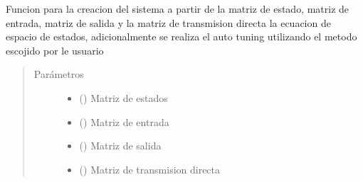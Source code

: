 \documentclass[letterpaper,10pt,spanish]{sphinxmanual}
\begin{document}
\begin{fulllineitems}
\label{\detokenize{codigos/rutinas_PID:rutinas_PID.system_creator_ss_tuning}}
Funcion para la creacion del sistema a partir de la matriz de estado, matriz de entrada, matriz de salida y la matriz de transmision directa la ecuacion de espacio de estados, adicionalmente se realiza el auto tuning utilizando el metodo escojido por le usuario
\begin{quote}\begin{description}
\item[{Parámetros}] \leavevmode\begin{itemize}
\item {} 
 () \textendash{} Matriz de estados

\item {} 
 () \textendash{} Matriz de entrada

\item {} 
 () \textendash{} Matriz de salida

\item {} 
 () \textendash{} Matriz de transmision directa

\end{itemize}

\end{description}\end{quote}

\end{fulllineitems}

\end{document}
